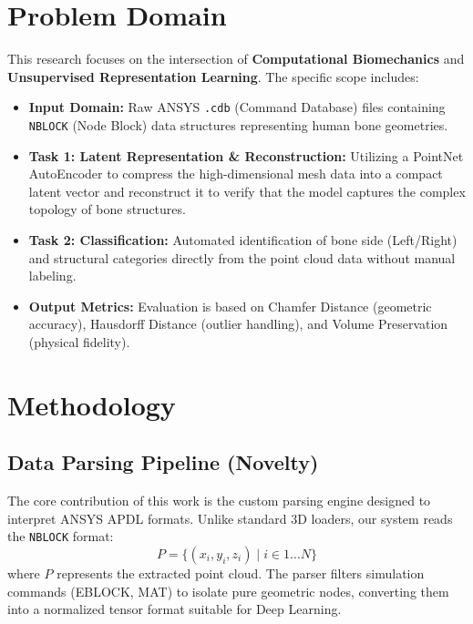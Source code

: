 \documentclass[conference]{IEEEtran}
\begin{document}
\section{Problem Domain}
This research focuses on the intersection of \textbf{Computational Biomechanics} and \textbf{Unsupervised Representation Learning}. The specific scope includes:
\begin{itemize}
    \item \textbf{Input Domain:} Raw ANSYS \texttt{.cdb} (Command Database) files containing \texttt{NBLOCK} (Node Block) data structures representing human bone geometries.
    \item \textbf{Task 1: Latent Representation \& Reconstruction:} Utilizing a PointNet AutoEncoder to compress the high-dimensional mesh data into a compact latent vector and reconstruct it to verify that the model captures the complex topology of bone structures.
    \item \textbf{Task 2: Classification:} Automated identification of bone side (Left/Right) and structural categories directly from the point cloud data without manual labeling.
    \item \textbf{Output Metrics:} Evaluation is based on Chamfer Distance (geometric accuracy), Hausdorff Distance (outlier handling), and Volume Preservation (physical fidelity).
\end{itemize}

\section{Methodology}

\subsection{Data Parsing Pipeline (Novelty)}
The core contribution of this work is the custom parsing engine designed to interpret ANSYS APDL formats. Unlike standard 3D loaders, our system reads the \texttt{NBLOCK} format:
\begin{equation}
    P = \{ (x_i, y_i, z_i) \mid i \in 1...N \}
\end{equation}
where $P$ represents the extracted point cloud. The parser filters simulation commands (EBLOCK, MAT) to isolate pure geometric nodes, converting them into a normalized tensor format suitable for Deep Learning.
\end{document}
